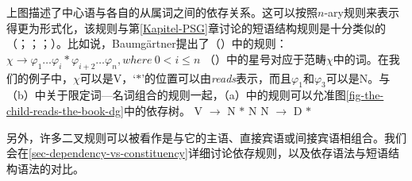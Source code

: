 上图描述了中心语与各自的从属词之间的依存关系。这可以按照$n$-ary规则\label{page-rule-format-dg}来表示得更为形式化，该规则与第\ref{Kapitel-PSG}章讨论的短语结构规则是十分类似的（\citealp[]{Gaifman65a}；\citealp[]{Hays64a-u}；\citealp[]{Baumgaertner70a}；\citealp[\S~4.1]{Heringer96a-u}）。比如说，Baumgärtner提出了（）中的规则：
\ea
$\chi \to \varphi_1 \ldots \varphi_i * \varphi_{i+2} \ldots \varphi_n, where~0 < i \leq n$
\z
（）中的星号对应于范畴$\chi$中的词。在我们的例子中，$\chi$可以是V，`$*$'的位置可以由\emph{reads}表示，而且$\varphi_1$和$\varphi_3$可以是N。与（b）中关于限定词—名词组合的规则一起，（a）中的规则可以允准图\ref{fig-the-child-reads-the-book-dg}中的依存树。
\eal
\ex V $\to$ N $*$ N
\ex N $\to$ D $*$
\zl

\noindent
另外，许多二叉规则可以被看作是与它的主语、直接宾语或间接宾语相组合\citep{Kahane2009a}。我们会在\ref{sec-dependency-vs-constituency}详细讨论依存规则，以及依存语法与短语结构语法的对比。


